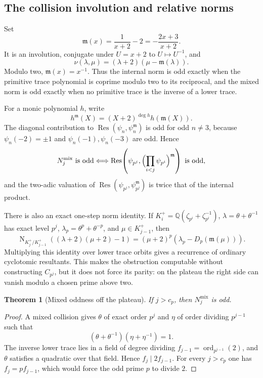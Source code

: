 \documentclass[a4paper]{article}
\newtheorem{theorem}{Theorem}[section]
\newcommand{\Q}{\mathbb{Q}}
\newcommand{\ord}[2][]{\operatorname{ord}_{#1}\!\left(#2\right)}
\DeclareMathOperator{\Res}{Res}
\DeclareMathOperator{\Nm}{N}
\begin{document}
\subsection{The collision involution and relative norms}

Set
\[
	\mathfrak m(x)=\frac1{x+2}-2=-\frac{2x+3}{x+2}.
\]
It is an involution, conjugate under $U=x+2$ to $U\mapsto U^{-1}$, and
\[
	\nu(\lambda,\mu)=(\lambda+2)(\mu-\mathfrak m(\lambda)).
\]
Modulo two, $\mathfrak m(x)=x^{-1}$.  Thus the internal norm is odd
exactly when the primitive trace polynomial is coprime modulo two to its
reciprocal, and the mixed norm is odd exactly when no primitive trace is
the inverse of a lower trace.

For a monic polynomial $h$, write
\[
	h^{\mathfrak m}(X)
	=(X+2)^{\deg h}h(\mathfrak m(X)).
\]
The diagonal contribution to
$\Res(\psi_n,\psi_n^{\mathfrak m})$ is odd for odd $n\neq3$, because
$\psi_n(-2)=\pm1$ and $\psi_n(-1),\psi_n(-3)$ are odd.  Hence
\begin{equation}\label{eq:collision-resultants}
	N_j^{\mathrm{mix}}\ \text{is odd}
	\Longleftrightarrow
	\Res\!\left(\psi_{p^j},
		\Bigl(\prod_{i<j}\psi_{p^i}\Bigr)^{\mathfrak m}\right)
	\ \text{is odd},
\end{equation}
and the two-adic valuation of
$\Res(\psi_{p^j},\psi_{p^j}^{\mathfrak m})$ is twice that of the internal
product.

There is also an exact one-step norm identity.  If
$K_i^+=\Q(\zeta_{p^i}+\zeta_{p^i}^{-1})$,
$\lambda=\theta+\theta^{-1}$ has exact level $p^j$,
$\lambda_p=\theta^p+\theta^{-p}$, and $\mu\in K_{j-1}^+$, then
\begin{equation}\label{eq:relative-collision-norm}
	\Nm_{K_j^+/K_{j-1}^+}
	\left((\lambda+2)(\mu+2)-1\right)
	=(\mu+2)^p\left(\lambda_p-D_p(\mathfrak m(\mu))\right).
\end{equation}
Multiplying this identity over lower trace orbits gives a recurrence of
ordinary cyclotomic resultants.  This makes the obstruction computable
without constructing $C_{p^j}$, but it does not force its parity: on the
plateau the right side can vanish modulo a chosen prime above two.

\begin{theorem}[Mixed oddness off the plateau]
\label{thm:mixed-odd}
	If $j>c_p$, then $N_j^{\mathrm{mix}}$ is odd.
\end{theorem}

\begin{proof}
	A mixed collision gives $\theta$ of exact order $p^j$ and $\eta$ of
	order dividing $p^{j-1}$ such that
	\[
		(\theta+\theta^{-1})(\eta+\eta^{-1})=1.
	\]
	The inverse lower trace lies in a field of degree dividing
	$f_{j-1}=\ord[p^{j-1}]{2}$, and $\theta$ satisfies a quadratic over
	that field.  Hence $f_j\mid2f_{j-1}$.  For every $j>c_p$ one has
	$f_j=p f_{j-1}$, which would force the odd prime $p$ to divide $2$.
\end{proof}
\end{document}
